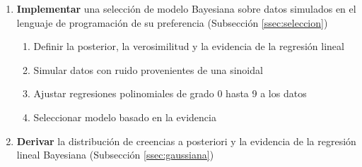 \documentclass[a4paper,10pt]{article}
\begin{document}
\begin{enumerate}
 \begin{enumerate}
 \item \textbf{Implementar} una selección de modelo Bayesiana sobre datos simulados en el lenguaje de programaci\'on de su preferencia (Subsecci\'on \ref{ssec:seleccion})
 \begin{enumerate}[i]
  \item Definir la posterior, la verosimilitud y la evidencia de la regresi\'on lineal
  \item Simular datos con ruido provenientes de una sinoidal
  \item Ajustar regresiones polinomiales de grado 0 hasta 9 a los datos
  \item Seleccionar modelo basado en la evidencia
 \end{enumerate}
 \item \textbf{Derivar} la distribuci\'on de creencias a posteriori y la evidencia de la regresi\'on lineal Bayesiana (Subsecci\'on \ref{ssec:gaussiana})
\end{enumerate}
\end{enumerate}

\newpage


\end{document}
